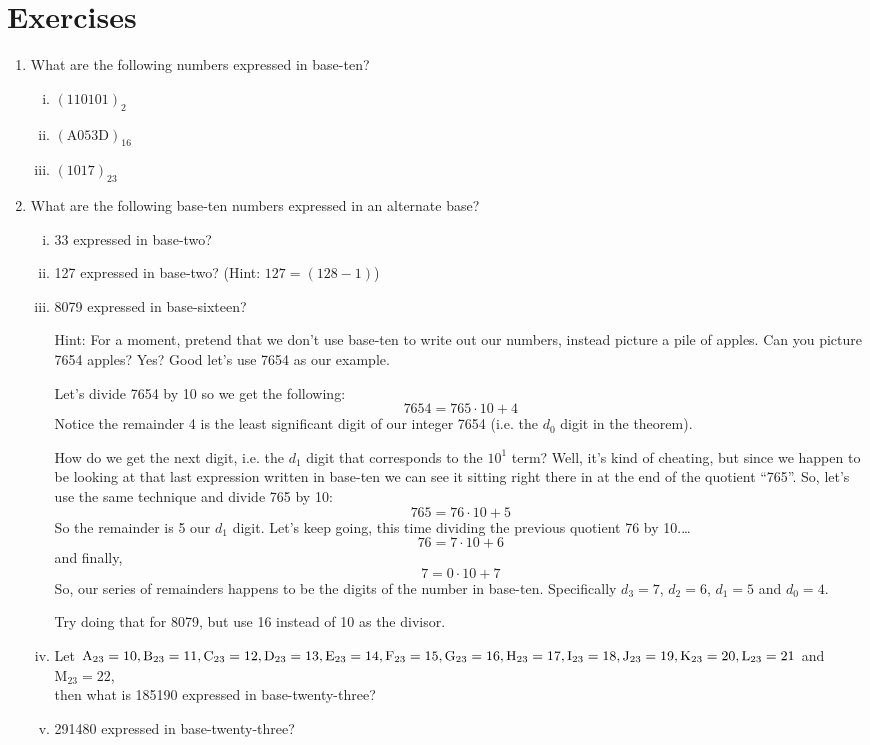 \documentclass{article}
\begin{document}
\section*{Exercises}
\begin{enumerate}
\item What are the following numbers expressed in base-ten?
\begin{enumerate}[i)]
\item $(110101)_2$
\item $(\text{A}053\text{D})_{16}$
\item $(1017)_{23}$
\end{enumerate}
\item What are the following base-ten numbers expressed in an alternate base?
\begin{enumerate}[i)]
\item 33 expressed in base-two?
\item 127 expressed in base-two? (Hint: $127 = (128-1)$)
\item 8079 expressed in base-sixteen?

Hint: For a moment, pretend that we don't use base-ten to
write out our numbers, instead picture a pile of apples.
Can you picture 7654 apples?  Yes?  Good let's use 7654 as our example.

Let's divide 7654 by 10 so we get the following:
\[7654 = 765\cdot{}10+4\]
Notice the remainder 4 is the least significant digit of our
integer 7654  (i.e. the $d_0$ digit in the theorem).

How do we get the next digit, i.e. the $d_1$ digit that corresponds to the $10^1$ term? Well, it’s kind of cheating, but
since we happen to be looking at that last expression written in
base-ten we can see it sitting right there in at the
end of the quotient ``765''. So, let's use the same technique and divide 765 by 10:
\[765 = 76\cdot{}10+5\]
So the remainder is 5 our $d_1$ digit.  Let's keep going, this time dividing the previous quotient 76 by 10.\dots	
\[76 = 7\cdot{}10+6\]
and finally,
\[7= 0\cdot{}10+7\]
So, our series of remainders happens to be the digits of the number in base-ten.
Specifically $d_3 = 7$, $d_2=6$, $d_1=5$ and $d_0=4$.

Try doing that for 8079, but use 16 instead of 10 as the divisor.
\item Let $\text{A}_{23} = 10, \text{B}_{23} = 11, \text{C}_{23} = 12, \text{D}_{23} = 13, \text{E}_{23} = 14, \text{F}_{23} = 15,
\text{G}_{23} = 16,\\
\text{H}_{23} = 17, \text{I}_{23} = 18, \text{J}_{23} = 19, \text{K}_{23} = 20, \text{L}_{23} = 21$ and $\text{M}_{23} = 22$,\\
then what is 185190 expressed in base-twenty-three?
\item 291480 expressed in base-twenty-three?
\end{enumerate}

\end{enumerate}
\end{document}
